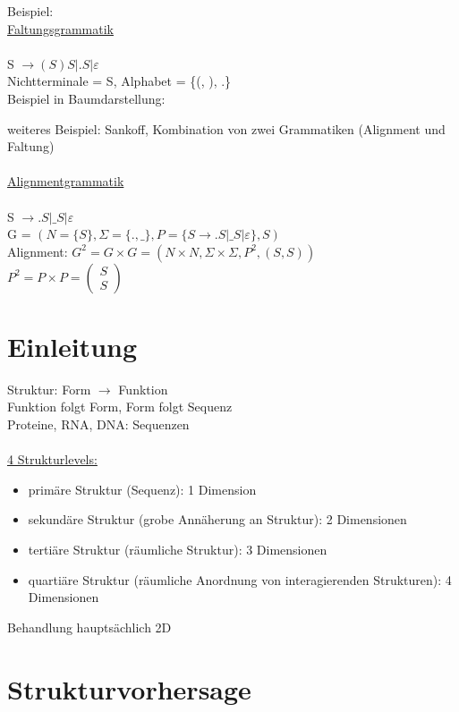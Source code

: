 \documentclass[12pt]{article}
\begin{document}
Beispiel:\\

\underline{Faltungsgrammatik}\\\\
S $\to (S)S | .S| \varepsilon$\\
Nichtterminale = S, Alphabet = \{(, ), .\}\\
Beispiel in Baumdarstellung:

weiteres Beispiel: Sankoff, Kombination von zwei Grammatiken (Alignment und Faltung)\\\\
\underline{Alignmentgrammatik}\\\\
S $\to .S | \_S | \varepsilon$\\
G = $(N = \{S\}, \Sigma = \{., \_\}, P=\{S \to .S | \_S | \varepsilon\}, S)$\\
Alignment: $G^2 = G \times G = (N \times N, \Sigma \times \Sigma, P^2, (S,S))$\\
$P^2 = P \times P = 
\left(
    \begin{array}{c}
      S \\
      S
    \end{array}
  \right)
$

\section{Einleitung}

Struktur: Form $\rightarrow$ Funktion\\
Funktion folgt Form, Form folgt Sequenz\\
Proteine, RNA, DNA: Sequenzen\\
\\
\underline{4 Strukturlevels:}
\begin{itemize}
	\item primäre Struktur (Sequenz): 1 Dimension
	\item sekundäre Struktur (grobe Annäherung an Struktur): 2 Dimensionen
	\item tertiäre Struktur (räumliche Struktur): 3 Dimensionen
	\item quartiäre Struktur (räumliche Anordnung von interagierenden Strukturen): 4 Dimensionen
\end{itemize}

Behandlung hauptsächlich 2D

\section{Strukturvorhersage}
\end{document}
